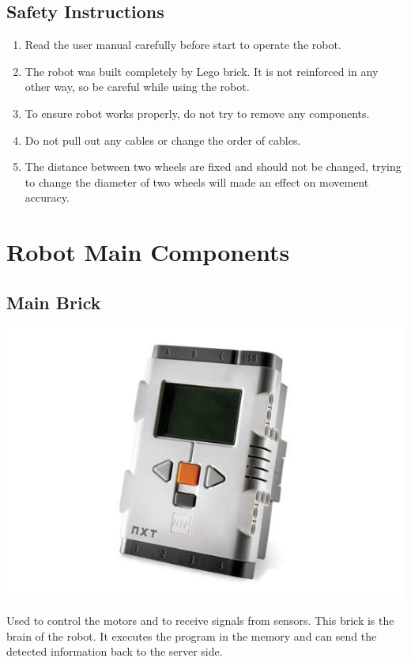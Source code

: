 \documentclass[11pt, a4paper]{report}
\begin{document}
\section{Safety Instructions}

\begin{enumerate}
\item Read the user manual carefully before start to operate the robot.

\item The robot was built completely by Lego brick. It is not reinforced in any other way, so be careful while using the robot.

\item To ensure robot works properly, do not try to remove any components. 

\item Do not pull out any cables or change the order of cables.

\item The distance between two wheels are fixed and should not be changed, trying to change the diameter of two wheels will made an effect on movement accuracy.

\end{enumerate}


\pagebreak


\chapter{Robot Main Components}

\section{Main Brick}

\begin{center}
\includegraphics[scale=0.9]{./image/Brick.jpg}\\[0.5cm]
\end{center}
Used to control the motors and to receive signals from sensors. This brick is the brain of the robot. It executes the program in the memory and can send the detected information back to the server side.
\end{document}
